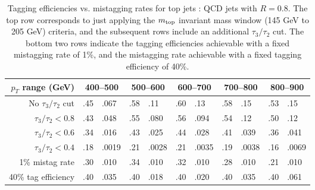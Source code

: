 \documentclass{JHEP3}
\begin{document}
\begin{table}[t]
  \begin{center}
    \begin{tabular}{r |r@{ : }lr@{ : }lr@{ : }lr@{ : }lr@{ : }l}
     \hline
     \hline
     $p_T$ range (GeV) & \multicolumn{2}{c}{400--500} & \multicolumn{2}{c}{500--600} & \multicolumn{2}{c}{600--700} & \multicolumn{2}{c}{700--800} & \multicolumn{2}{c}{800--900}\\
     \hline
     No $\tau_3/\tau_2$ cut & .45 & .067 & .58 & .11 & .60 & .13 & .58 & .15 & .53 & .15 \\
     $\tau_3/\tau_2 < 0.8$ & .43 & .048 & .55 & .080 & .56 & .094 & .54 & .12 & .50 & .12 \\
     $\tau_3/\tau_2 < 0.6$ & .34 & .016 & .43 & .025 & .44 & .028 & .41 & .039 & .36 & .041 \\
     $\tau_3/\tau_2 < 0.4$ & .18 & .0019 & .21 & .0028 & .21 & .0035 & .19 & .0038 & .16 & .0069 \\
    \hline
     1\% mistag rate & .30 & .010 & .34 & .010 & .32 & .010 & .28 & .010 & .21 & .010\\
     40\% tag efficiency & .40 & .035 & .40 & .018 & .40 & .020 & .40 & .035 & .40 & .061\\
     \hline
     \hline
    \end{tabular}
  \end{center}

    \caption{Tagging efficiencies vs. mistagging rates for top jets : QCD jets with $R= 0.8$.  The top row corresponds to just applying the $m_{\rm top}$ invariant mass window (145 GeV to 205 GeV) criteria, and the subsequent rows include an additional $\tau_3/\tau_2$ cut.  The bottom two rows indicate the tagging efficiencies achievable with  a fixed mistagging rate of 1\%, and the mistagging rate achievable with a fixed tagging efficiency of 40\%.}
  \label{tab:TopSigEff08}
\end{table}
\end{document}
